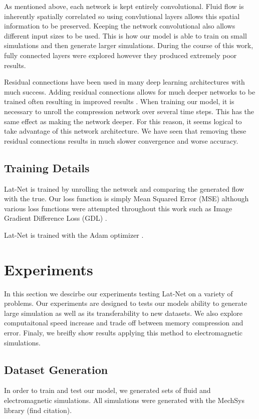 \documentclass{article}
\begin{document}
As mentioned above, each network is kept entirely convolutional. Fluid flow is inherently spatially correlated so using convlutional layers allows this spatial information to be preserved. Keeping the network convolutional also allows different input sizes to be used. This is how our model is able to train on small simulations and then generate larger simulations. During the course of this work, fully connected layers were explored however they produced extremely poor results.

Residual connections have been used in many deep learning architectures with much success. Adding residual connections allows for much deeper networks to be trained often resulting in improved results \cite{he2016deep}. When training our model, it is necessary to unroll the compression network over several time steps. This has the same effect as making the network deeper. For this reason, it seems logical to take advantage of this network architecture. We have seen that removing these residual connections results in much slower convergence and worse accuracy.

\subsection{Training Details}

Lat-Net is trained by unrolling the network and comparing the generated flow with the true. Our loss function is simply Mean Squared Error (MSE) although various loss functions were attempted throughout this work such as Image Gradient Difference Loss (GDL) \cite{mathieu2015deep}.  

Lat-Net is trained with the Adam optimizer \cite{kingma2014adam}.

\section{Experiments}

In this section we descirbe our experiments testing Lat-Net on a variety of problems. Our experiments are designed to tests our models ability to generate large simulation as well as its transferability to new datasets. We also explore computaitonal speed increase and trade off between memory compression and error. Finaly, we breifly show results applying this method to electromagnetic simulations.

\subsection{Dataset Generation}
In order to train and test our model, we generated sets of fluid and electromagnetic simulations. All simulations were generated with the MechSys library (find citation).
\end{document}
